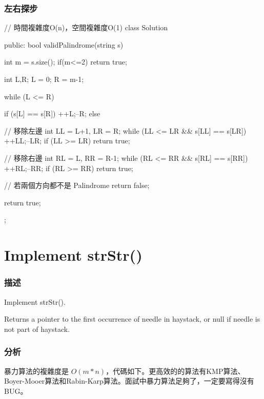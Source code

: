 \subsubsection{左右探步}
\begin{Code}
// 時間複雜度O(n)，空間複雜度O(1)
class Solution {
public:
    bool validPalindrome(string s) {
        int m = s.size();
        if(m<=2) return true;

        int L,R;
        L = 0;
        R = m-1;

        while (L <= R)
        {
            if (s[L] == s[R])
            {
                ++L;--R;
            }
            else
            {
                // 移除左邊
                int LL = L+1, LR = R;
                while (LL <= LR && s[LL] == s[LR]) {++LL;--LR;}
                if (LL >= LR) return true;

                // 移除右邊
                int RL = L, RR = R-1;
                while (RL <= RR && s[RL] == s[RR]) {++RL;--RR;}
                if (RL >= RR) return true;

                // 若兩個方向都不是 Palindrome
                return false;

            }

        }

        return true;
    }
};
\end{Code}

\section{Implement strStr()} %
\label{sec:strstr}


\subsubsection{描述}
Implement strStr().

Returns a pointer to the first occurrence of needle in haystack, or null if needle is not part of haystack.


\subsubsection{分析}
暴力算法的複雜度是 $O(m*n)$，代碼如下。更高效的的算法有KMP算法、Boyer-Mooer算法和Rabin-Karp算法。面試中暴力算法足夠了，一定要寫得沒有BUG。


